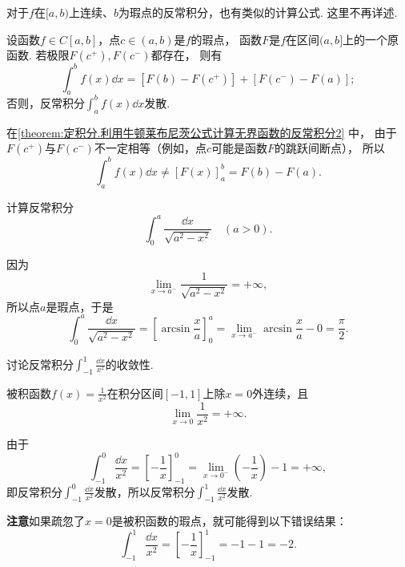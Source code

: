对于\(f\)在\([a,b)\)上连续、\(b\)为瑕点的反常积分，也有类似的计算公式.
这里不再详述.

\begin{theorem}\label{theorem:定积分.利用牛顿莱布尼茨公式计算无界函数的反常积分2}
设函数\(f \in C[a,b]\)，点\(c\in(a,b)\)是\(f\)的瑕点，%
函数\(F\)是\(f\)在区间\((a,b]\)上的一个原函数.
若极限\(F(c^+),F(c^-)\)都存在，%
则有
\begin{equation}\label{equation:定积分.利用牛顿莱布尼茨公式计算无界函数的反常积分2}
\int_a^b f(x) \dd{x}
= [F(b) - F(c^+)] + [F(c^-) - F(a)];
\end{equation}
否则，反常积分\(\int_a^b f(x) \dd{x}\)发散.
\end{theorem}
在\cref{theorem:定积分.利用牛顿莱布尼茨公式计算无界函数的反常积分2} 中，%
由于\(F(c^+)\)与\(F(c^-)\)不一定相等（例如，点\(c\)可能是函数\(F\)的跳跃间断点），%
所以\[
\int_a^b f(x) \dd{x}
\neq [F(x)]_a^b = F(b) - F(a).
\]

\begin{example}
计算反常积分\[
\int_0^a \frac{\dd{x}}{\sqrt{a^2-x^2}}\quad(a>0).
\]
\begin{solution}
因为\[
\lim\limits_{x \to a^-} \frac{1}{\sqrt{a^2-x^2}} = +\infty,
\]所以点\(a\)是瑕点，于是\[
\int_0^a \frac{\dd{x}}{\sqrt{a^2-x^2}}
= \left[ \arcsin\frac{x}{a} \right]_0^a
= \lim\limits_{x \to a^-} \arcsin\frac{x}{a} - 0 = \frac{\pi}{2}.
\]
\end{solution}
\end{example}

\begin{example}
讨论反常积分\(\int_{-1}^1 \frac{\dd{x}}{x^2}\)的收敛性.
\begin{solution}
被积函数\(f(x) = \frac{1}{x^2}\)在积分区间\([-1,1]\)上除\(x=0\)外连续，且\[
\lim\limits_{x\to0} \frac{1}{x^2} = +\infty.
\]

由于\[
\int_{-1}^0 \frac{\dd{x}}{x^2}
= \left[-\frac{1}{x}\right]_{-1}^0
= \lim\limits_{x\to0^-} \left(-\frac{1}{x}\right) - 1
= +\infty,
\]即反常积分\(\int_{-1}^0 \frac{\dd{x}}{x^2}\)发散，所以反常积分\(\int_{-1}^1 \frac{\dd{x}}{x^2}\)发散.
\end{solution}

\textbf{注意}\hspace{1em}如果疏忽了\(x=0\)是被积函数的瑕点，就可能得到以下错误结果：\[
\int_{-1}^1 \frac{\dd{x}}{x^2}
= \left[ -\frac{1}{x} \right]_{-1}^1
= -1 - 1 = -2.
\]
\end{example}


